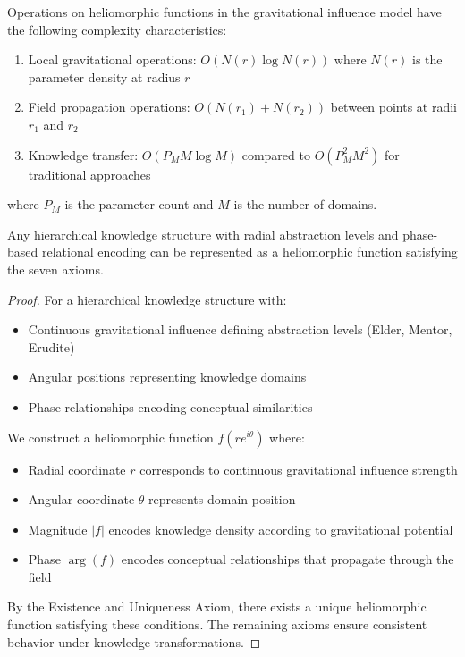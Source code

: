 \begin{theorem}
Operations on heliomorphic functions in the gravitational influence model have the following complexity characteristics:
\begin{enumerate}
    \item Local gravitational operations: $O(N(r) \log N(r))$ where $N(r)$ is the parameter density at radius $r$
    \item Field propagation operations: $O(N(r_1) + N(r_2))$ between points at radii $r_1$ and $r_2$
    \item Knowledge transfer: $O(P_M M \log M)$ compared to $O(P_M^2 M^2)$ for traditional approaches
\end{enumerate}
where $P_M$ is the parameter count and $M$ is the number of domains.
\end{theorem}

\begin{theorem}
Any hierarchical knowledge structure with radial abstraction levels and phase-based relational encoding can be represented as a heliomorphic function satisfying the seven axioms.
\end{theorem}

\begin{proof}
For a hierarchical knowledge structure with:
\begin{itemize}
    \item Continuous gravitational influence defining abstraction levels (Elder, Mentor, Erudite)
    \item Angular positions representing knowledge domains
    \item Phase relationships encoding conceptual similarities
\end{itemize}

We construct a heliomorphic function $f(re^{i\theta})$ where:
\begin{itemize}
    \item Radial coordinate $r$ corresponds to continuous gravitational influence strength
    \item Angular coordinate $\theta$ represents domain position
    \item Magnitude $|f|$ encodes knowledge density according to gravitational potential
    \item Phase $\arg(f)$ encodes conceptual relationships that propagate through the field
\end{itemize}

By the Existence and Uniqueness Axiom, there exists a unique heliomorphic function satisfying these conditions. The remaining axioms ensure consistent behavior under knowledge transformations.
\end{proof}

